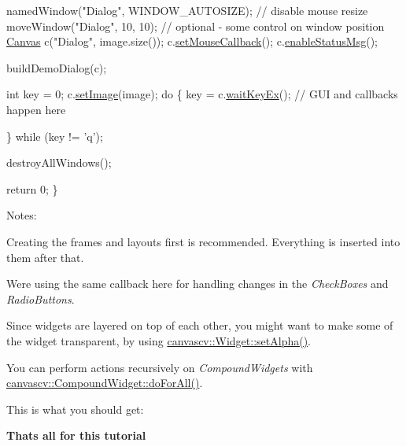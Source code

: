 \begin{DoxyCode}
    namedWindow(\textcolor{stringliteral}{"Dialog"}, WINDOW\_AUTOSIZE); \textcolor{comment}{// disable mouse resize}
    moveWindow(\textcolor{stringliteral}{"Dialog"}, 10, 10); \textcolor{comment}{// optional - some control on window position}
    \hyperlink{classcanvascv_1_1Canvas}{Canvas} c(\textcolor{stringliteral}{"Dialog"}, image.size());
    c.\hyperlink{classcanvascv_1_1Canvas_acf6e5d4b40aec610b0dc8c4f6bf93ac1}{setMouseCallback}();
    c.\hyperlink{classcanvascv_1_1Canvas_a402c43a42c0089c48a96e5303c1c1fe8}{enableStatusMsg}();

    buildDemoDialog(c);

    \textcolor{keywordtype}{int} key = 0;
    c.\hyperlink{classcanvascv_1_1Canvas_a441c5882c7ebebd454a306b3c3478ae7}{setImage}(image);
    \textcolor{keywordflow}{do}
    \{
        key = c.\hyperlink{classcanvascv_1_1Canvas_a59397db05f5d9e45264f626f6a2ae528}{waitKeyEx}(); \textcolor{comment}{// GUI and callbacks happen here}

    \} \textcolor{keywordflow}{while} (key != \textcolor{charliteral}{'q'});

    destroyAllWindows();

    \textcolor{keywordflow}{return} 0;
\}
\end{DoxyCode}
 Notes\+:
\begin{DoxyItemize}
\item Creating the frames and layouts first is recommended. Everything is inserted into them after that.
\item We\textquotesingle{}re using the same callback here for handling changes in the {\itshape Check\+Boxes} and {\itshape Radio\+Buttons}.
\item Since widgets are layered on top of each other, you might want to make some of the widget transparent, by using \hyperlink{classcanvascv_1_1Widget_a4c16525b31e70acd43372af0c1e60d42}{canvascv\+::\+Widget\+::set\+Alpha()}.
\item You can perform actions recursively on {\itshape Compound\+Widgets} with \hyperlink{classcanvascv_1_1CompoundWidget_aa7d0f488468fca5707aa49ea35e9c67e}{canvascv\+::\+Compound\+Widget\+::do\+For\+All()}.
\item This is what you should get\+:  ~\newline

\end{DoxyItemize}

{\bfseries That\textquotesingle{}s all for this tutorial} 